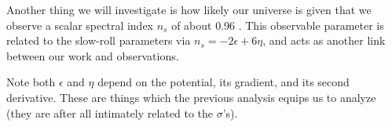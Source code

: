 \documentclass[12pt]{article}
\begin{document}
Another thing we will investigate is how likely our universe is given that we observe a scalar spectral index $n_s$ of about 0.96 \cite{Planck}. This observable parameter is related to the slow-roll parameters via $n_s = -2\epsilon + 6\eta$, and acts as another link between our work and observations.

Note both $\epsilon$ and $\eta$ depend on the potential, its gradient, and its second derivative. These are things which the previous analysis equips us to analyze (they are after all intimately related to the $\sigma$'s).

\end{document}
